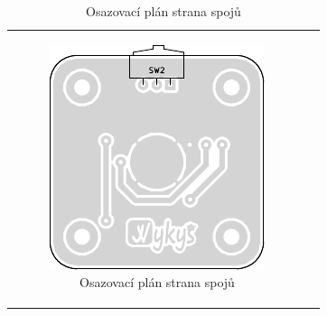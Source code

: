 \begin{table}[H]
\begin{center}
\begin{tabular}{c c}
\begin{minipage}{0.48\textwidth}
\begin{figure}[H]
          \includegraphics[width=\textwidth]{../design/svg/osazovak_bot.pdf}
          \caption{Osazovací plán strana spojů}
          \label{img:3}
        \end{figure}
      \end{minipage}
    \end{tabular}
  \end{center}	
\end{table}



